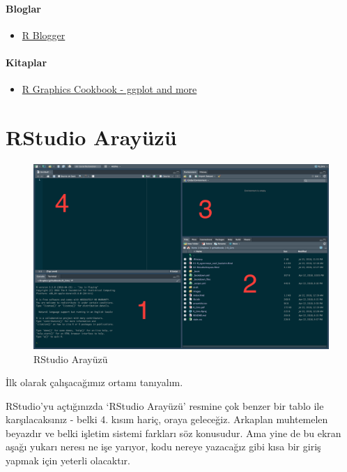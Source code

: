 \documentclass[
]{book}
\providecommand{\tightlist}{%
  \setlength{\itemsep}{0pt}\setlength{\parskip}{0pt}}
\begin{document}
\hypertarget{bloglar}{%
\subsubsection{Bloglar}\label{bloglar}}

\begin{itemize}
\tightlist
\item
  \href{https://www.r-bloggers.com/}{R Blogger}
\end{itemize}

\hypertarget{kitaplar}{%
\subsubsection{Kitaplar}\label{kitaplar}}

\begin{itemize}
\tightlist
\item
  \href{http://www.cookbook-r.com/Graphs/}{R Graphics Cookbook - ggplot and more}
\end{itemize}

\hypertarget{rstudio}{%
\chapter{RStudio Arayüzü}\label{rstudio}}

\begin{figure}
\centering
\includegraphics{images/rstudio.png}
\caption{RStudio Arayüzü}
\end{figure}

İlk olarak çalışacağımız ortamı tanıyalım.

RStudio'yu açtığınızda `RStudio Arayüzü' resmine çok benzer bir tablo ile karşılacaksınız - belki 4. kısım hariç, oraya geleceğiz. Arkaplan muhtemelen beyazdır ve belki işletim sistemi farkları söz konusudur. Ama yine de bu ekran aşağı yukarı neresı ne işe yarıyor, kodu nereye yazacağız gibi kısa bir giriş yapmak için yeterli olacaktır.
\end{document}
